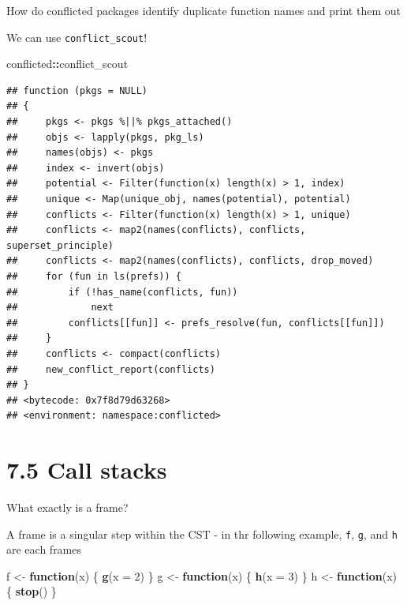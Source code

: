 \documentclass[]{book}
\newenvironment{Shaded}{\begin{snugshade}}{\end{snugshade}}
\newcommand{\ControlFlowTok}[1]{\textcolor[rgb]{0.13,0.29,0.53}{\textbf{#1}}}
\newcommand{\DataTypeTok}[1]{\textcolor[rgb]{0.13,0.29,0.53}{#1}}
\newcommand{\DecValTok}[1]{\textcolor[rgb]{0.00,0.00,0.81}{#1}}
\newcommand{\KeywordTok}[1]{\textcolor[rgb]{0.13,0.29,0.53}{\textbf{#1}}}
\newcommand{\NormalTok}[1]{#1}
\newcommand{\OperatorTok}[1]{\textcolor[rgb]{0.81,0.36,0.00}{\textbf{#1}}}
\newcommand{\StringTok}[1]{\textcolor[rgb]{0.31,0.60,0.02}{#1}}
\begin{document}
How do conflicted packages identify duplicate function names and print them out

We can use \texttt{conflict\_scout}!

\begin{Shaded}
\begin{Highlighting}[]
\NormalTok{conflicted}\OperatorTok{::}\NormalTok{conflict_scout}
\end{Highlighting}
\end{Shaded}

\begin{verbatim}
## function (pkgs = NULL) 
## {
##     pkgs <- pkgs %||% pkgs_attached()
##     objs <- lapply(pkgs, pkg_ls)
##     names(objs) <- pkgs
##     index <- invert(objs)
##     potential <- Filter(function(x) length(x) > 1, index)
##     unique <- Map(unique_obj, names(potential), potential)
##     conflicts <- Filter(function(x) length(x) > 1, unique)
##     conflicts <- map2(names(conflicts), conflicts, superset_principle)
##     conflicts <- map2(names(conflicts), conflicts, drop_moved)
##     for (fun in ls(prefs)) {
##         if (!has_name(conflicts, fun)) 
##             next
##         conflicts[[fun]] <- prefs_resolve(fun, conflicts[[fun]])
##     }
##     conflicts <- compact(conflicts)
##     new_conflict_report(conflicts)
## }
## <bytecode: 0x7f8d79d63268>
## <environment: namespace:conflicted>
\end{verbatim}

\hypertarget{call-stacks}{%
\section*{7.5 Call stacks}\label{call-stacks}}

What exactly is a frame?

A frame is a singular step within the CST - in thr following example, \texttt{f}, \texttt{g}, and \texttt{h} are each frames

\begin{Shaded}
\begin{Highlighting}[]
\NormalTok{f <-}\StringTok{ }\ControlFlowTok{function}\NormalTok{(x) \{}
  \KeywordTok{g}\NormalTok{(}\DataTypeTok{x =} \DecValTok{2}\NormalTok{)}
\NormalTok{\}}
\NormalTok{g <-}\StringTok{ }\ControlFlowTok{function}\NormalTok{(x) \{}
  \KeywordTok{h}\NormalTok{(}\DataTypeTok{x =} \DecValTok{3}\NormalTok{)}
\NormalTok{\}}
\NormalTok{h <-}\StringTok{ }\ControlFlowTok{function}\NormalTok{(x) \{}
  \KeywordTok{stop}\NormalTok{()}
\NormalTok{\}}
\end{Highlighting}
\end{Shaded}
\end{document}
